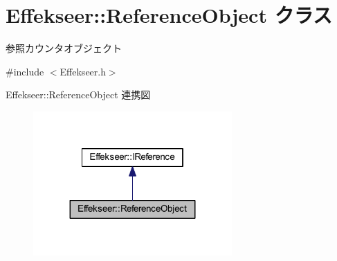 \hypertarget{class_effekseer_1_1_reference_object}{}\section{Effekseer\+:\+:Reference\+Object クラス}
\label{class_effekseer_1_1_reference_object}


参照カウンタオブジェクト  




{\ttfamily \#include $<$Effekseer.\+h$>$}



Effekseer\+:\+:Reference\+Object 連携図\nopagebreak
\begin{figure}[H]
\begin{center}
\leavevmode
\includegraphics[width=215pt]{class_effekseer_1_1_reference_object__coll__graph}
\end{center}
\end{figure}
